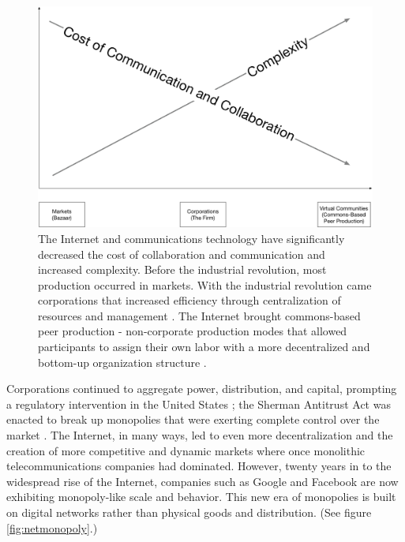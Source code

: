 \begin{figure}[t]
 \centering
 \includegraphics[width=1\textwidth]{pictures/TheInternetMarkets}
 \caption[The Internet decreased collaboration and communication costs and increased complexity.]{The Internet and communications technology have significantly decreased the cost of collaboration and communication and increased complexity. Before the industrial revolution, most production occurred in markets. With the industrial revolution came corporations that increased efficiency through centralization of resources and management \cite{coase_nature_1937}. The Internet brought commons-based peer production - non-corporate production modes that allowed participants to assign their own labor with a more decentralized and bottom-up organization structure \cite{benkler_coases_2002}.}
 \label{fig:internetcomplex}
\end{figure}

Corporations continued to aggregate power, distribution, and capital, prompting a regulatory intervention in the United States ; the Sherman Antitrust Act was enacted to break up monopolies that were exerting complete control over the market \cite{ShermanA12:online}. The Internet, in many ways, led to even more decentralization and the creation of more competitive and dynamic markets where once monolithic telecommunications companies had dominated. However, twenty years in to the widespread rise of the Internet, companies such as Google and Facebook are now exhibiting monopoly-like scale and behavior. This new era of monopolies is built on digital networks rather than physical goods and distribution. (See figure \autoref{fig:netmonopoly}.)

